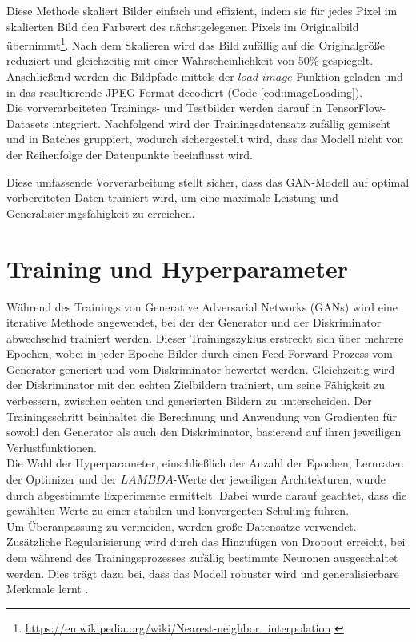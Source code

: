 Diese Methode skaliert Bilder einfach und effizient, indem sie für jedes Pixel im skalierten Bild den Farbwert des nächstgelegenen Pixels im Originalbild übernimmt\footnote{\url{https://en.wikipedia.org/wiki/Nearest-neighbor_interpolation} \label{note:nearestNeighbor}}.
Nach dem Skalieren wird das Bild zufällig auf die Originalgröße reduziert und gleichzeitig mit einer Wahrscheinlichkeit von 50\% gespiegelt.
Anschließend werden die Bildpfade mittels der $load\_image$-Funktion geladen und in das resultierende JPEG-Format decodiert (Code \ref{cod:imageLoading}).
\\\newline
Die vorverarbeiteten Trainings- und Testbilder werden darauf in TensorFlow-Datasets integriert. Nachfolgend wird der Trainingsdatensatz zufällig gemischt und in Batches gruppiert, wodurch sichergestellt wird, dass das Modell nicht von der Reihenfolge der Datenpunkte beeinflusst wird.


Diese umfassende Vorverarbeitung stellt sicher, dass das GAN-Modell auf optimal vorbereiteten Daten trainiert wird, um eine maximale Leistung und Generalisierungsfähigkeit zu erreichen.





\section{Training und Hyperparameter}

Während des Trainings von Generative Adversarial Networks (GANs) wird eine iterative Methode angewendet, bei der der Generator und der Diskriminator abwechselnd trainiert werden. Dieser Trainingszyklus erstreckt sich über mehrere Epochen, wobei in jeder Epoche Bilder durch einen Feed-Forward-Prozess vom Generator generiert und vom Diskriminator bewertet werden. Gleichzeitig wird der Diskriminator mit den echten Zielbildern trainiert, um seine Fähigkeit zu verbessern, zwischen echten und generierten Bildern zu unterscheiden. Der Trainingsschritt beinhaltet die Berechnung und Anwendung von Gradienten für sowohl den Generator als auch den Diskriminator, basierend auf ihren jeweiligen Verlustfunktionen.
\\\newline
Die Wahl der Hyperparameter, einschließlich der Anzahl der Epochen, Lernraten der Optimizer und der $LAMBDA$-Werte der jeweiligen Architekturen, wurde durch abgestimmte Experimente ermittelt. Dabei wurde darauf geachtet, dass die gewählten Werte zu einer stabilen und konvergenten Schulung führen.
\\\newline
Um Überanpassung zu vermeiden, werden große Datensätze verwendet. Zusätzliche Regularisierung wird durch das Hinzufügen von Dropout erreicht, bei dem während des Trainingsprozesses zufällig bestimmte Neuronen ausgeschaltet werden. Dies trägt dazu bei, dass das Modell robuster wird und generalisierbare Merkmale lernt \cite{Yamashita.2018}. 

